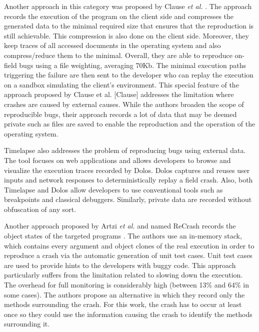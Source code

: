 \documentclass[times]{smrauth}
\begin{document}
Another approach in this category was  proposed by Clause {\it et al.} \cite{Clause2007}. The approach records the execution of the program on the client side and compresses the generated data to the minimal required size that ensures that the reproduction is still achievable. This compression is also done on the client side. Moreover, they keep traces of all accessed documents in the operating system and also compress/reduce them to the minimal. Overall, they are able to reproduce on-field bugs using a file weighting, averaging 70Kb. The minimal execution paths triggering the failure are then sent to the developer who can replay the execution on a sandbox simulating the client's environment.
This special feature of the approach proposed by Clause et al. [Clause] addresses the limitation where crashes are caused by external causes. While the authors broaden the scope of reproducible bugs, their approach records a lot of data that may be deemed private such as files are saved to enable the reproduction and the operation of the operating system.

Timelapse \cite{Burg2013} also addresses the problem of reproducing bugs using external data. The tool focuses on web applications and allows developers to browse and visualize the execution traces recorded by Dolos. Dolos captures and reuses user inputs and network responses to deterministically replay a field crash. Also, both Timelapse and Dolos allow developers to use conventional tools such as breakpoints and classical debuggers. Similarly, private data are recorded without obfuscation of any sort.

Another approach proposed by Artzi {\it et al.} and named ReCrash records the object states of the targeted programs \cite{Artzi2008}. The authors use an in-memory stack, which contains every argument and object clones of the real execution in order to reproduce a crash via the automatic generation of unit test cases. 
Unit test cases are used to provide hints to the developers with buggy code. 
This approach particularly suffers from the limitation related to slowing down the execution. 
The overhead for full monitoring is considerably high (between 13\% and 64\% in some cases). 
The authors  propose an alternative in which they record only the methods surrounding the crash. For this work, the crash has to occur at least once so they could use the information causing the crash to identify the methods surrounding it.
\end{document}
